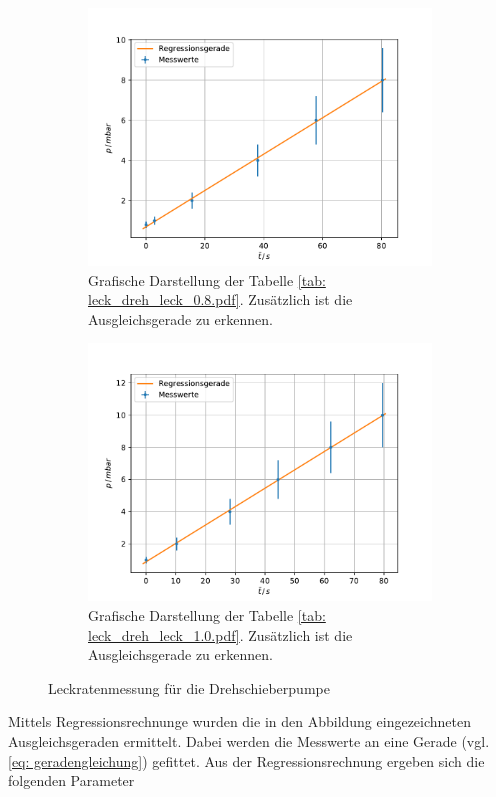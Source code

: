 \begin{figure}
    \centering
    \begin{subfigure}{0.4\textwidth}
        \centering
        \includegraphics[width=1\textwidth]{../Messdaten/plots/dreh/leckrate_dreh_08.pdf}
        \caption{Grafische Darstellung der Tabelle \ref{tab: leck_dreh_leck_0.8.pdf}. Zusätzlich ist die Ausgleichsgerade zu erkennen.}
        \label{fig: drehs_leck_1}
    \end{subfigure}
    \begin{subfigure}{0.4\textwidth}
        \centering
        \includegraphics[width=1\textwidth]{../Messdaten/plots/dreh/leckrate_dreh_10.pdf}
        \caption{Grafische Darstellung der Tabelle \ref{tab: leck_dreh_leck_1.0.pdf}. Zusätzlich ist die Ausgleichsgerade zu erkennen.}
    \end{subfigure}
    \caption{Leckratenmessung für die Drehschieberpumpe}
      \label{fig: leck_dreh_2}
\end{figure}
Mittels Regressionsrechnunge wurden die in den Abbildung eingezeichneten Ausgleichsgeraden ermittelt.
Dabei werden die Messwerte an eine Gerade (vgl. \eqref{eq: geradengleichung}) gefittet.
Aus der Regressionsrechnung ergeben sich die folgenden Parameter


